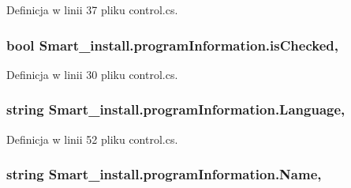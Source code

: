 Definicja w linii 37 pliku control.\+cs.

\hypertarget{class_smart__install_1_1program_information_a1deafe73f1cf16a6cde32027b58ee395}{
\subsubsection[{is\+Checked}]{\setlength{\rightskip}{0pt plus 5cm}bool Smart\+\_\+install.\+program\+Information.\+is\+Checked\hspace{0.3cm}{\ttfamily [get]}, {\ttfamily [set]}}}\label{class_smart__install_1_1program_information_a1deafe73f1cf16a6cde32027b58ee395}


Definicja w linii 30 pliku control.\+cs.

\hypertarget{class_smart__install_1_1program_information_a452ff269c1ae053f78e04000b29250ae}{
\subsubsection[{Language}]{\setlength{\rightskip}{0pt plus 5cm}string Smart\+\_\+install.\+program\+Information.\+Language\hspace{0.3cm}{\ttfamily [get]}, {\ttfamily [set]}}}\label{class_smart__install_1_1program_information_a452ff269c1ae053f78e04000b29250ae}


Definicja w linii 52 pliku control.\+cs.

\hypertarget{class_smart__install_1_1program_information_a813c97c4a629f8cc26d55c22473d2249}{
\subsubsection[{Name}]{\setlength{\rightskip}{0pt plus 5cm}string Smart\+\_\+install.\+program\+Information.\+Name\hspace{0.3cm}{\ttfamily [get]}, {\ttfamily [set]}}}\label{class_smart__install_1_1program_information_a813c97c4a629f8cc26d55c22473d2249}


